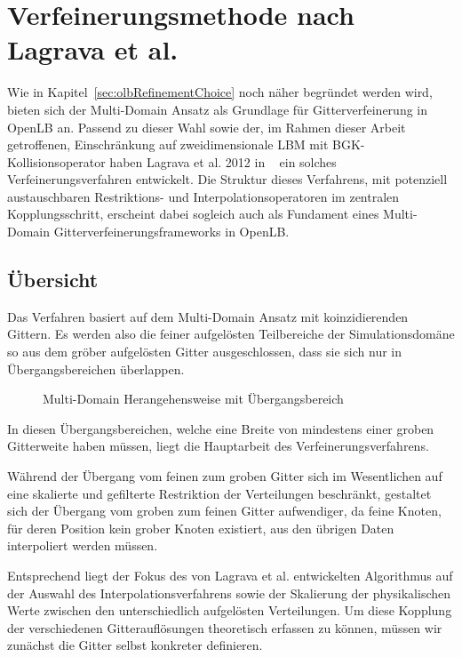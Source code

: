 \newpage
\section{Verfeinerungsmethode nach Lagrava et al.}\label{kap:Lagrava}

Wie in Kapitel~\ref{sec:olbRefinementChoice} noch näher begründet werden wird, bieten sich der Multi-Domain Ansatz als Grundlage für Gitterverfeinerung in OpenLB an. Passend zu dieser Wahl sowie der, im Rahmen dieser Arbeit getroffenen, Einschränkung auf zweidimensionale LBM mit BGK-Kollisionsoperator haben Lagrava et al. 2012 in ~\cite{Lagrava12} ein solches Verfeinerungsverfahren entwickelt. Die Struktur dieses Verfahrens, mit potenziell austauschbaren Restriktions- und Interpolationsoperatoren im zentralen Kopplungsschritt, erscheint dabei sogleich auch als Fundament eines Multi-Domain Gitterverfeinerungsframeworks in OpenLB.

\subsection{Übersicht}

Das Verfahren basiert auf dem Multi-Domain Ansatz \cite[Kap.~3.1]{Lagrava12} mit koinzidierenden Gittern. Es werden also die feiner aufgelösten Teilbereiche der Simulationsdomäne so aus dem gröber aufgelösten Gitter ausgeschlossen, dass sie sich nur in Übergangsbereichen überlappen.

\begin{figure}[h]
\centering

\caption{Multi-Domain Herangehensweise mit Übergangsbereich \cite[vgl.~Abb.~3]{Lagrava12}}
\label{fig:MultiDomainOverlap}
\end{figure}

\noindent
In diesen Übergangsbereichen, welche eine Breite von mindestens einer groben Gitterweite haben müssen, liegt die Hauptarbeit des Verfeinerungsverfahrens.

\bigskip
Während der Übergang vom feinen zum groben Gitter sich im Wesentlichen auf eine skalierte und gefilterte Restriktion der Verteilungen beschränkt, gestaltet sich der Übergang vom groben zum feinen Gitter aufwendiger, da feine Knoten, für deren Position kein grober Knoten existiert, aus den übrigen Daten interpoliert werden müssen.

Entsprechend liegt der Fokus des von Lagrava et al. entwickelten Algorithmus auf der Auswahl des Interpolationsverfahrens sowie der Skalierung der physikalischen Werte zwischen den unterschiedlich aufgelösten Verteilungen. Um diese Kopplung der verschiedenen Gitterauflösungen theoretisch erfassen zu können, müssen wir zunächst die Gitter selbst konkreter definieren.

